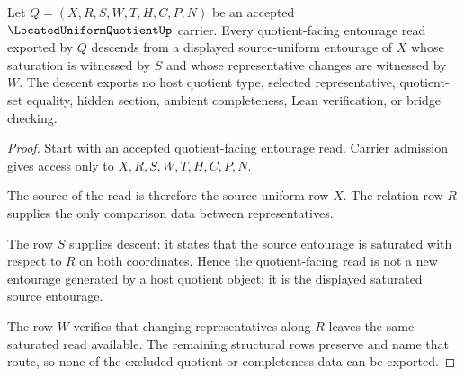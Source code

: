 \begin{theorem}
\label{thm:located-uniform-quotient-saturated-entourage-descent}
Let $Q=(X,R,S,W,T,H,C,P,N)$ be an accepted $\LocatedUniformQuotientUp$ carrier. Every quotient-facing entourage read exported by $Q$ descends from a displayed source-uniform entourage of $X$ whose saturation is witnessed by $S$ and whose representative changes are witnessed by $W$. The descent exports no host quotient type, selected representative, quotient-set equality, hidden section, ambient completeness, Lean verification, or bridge checking.
\end{theorem}
\begin{proof}
Start with an accepted quotient-facing entourage read. Carrier admission gives access only to $X,R,S,W,T,H,C,P,N$.

The source of the read is therefore the source uniform row $X$. The relation row $R$ supplies the only comparison data between representatives.

The row $S$ supplies descent: it states that the source entourage is saturated with respect to $R$ on both coordinates. Hence the quotient-facing read is not a new entourage generated by a host quotient object; it is the displayed saturated source entourage.

The row $W$ verifies that changing representatives along $R$ leaves the same saturated read available. The remaining structural rows preserve and name that route, so none of the excluded quotient or completeness data can be exported.
\end{proof}

